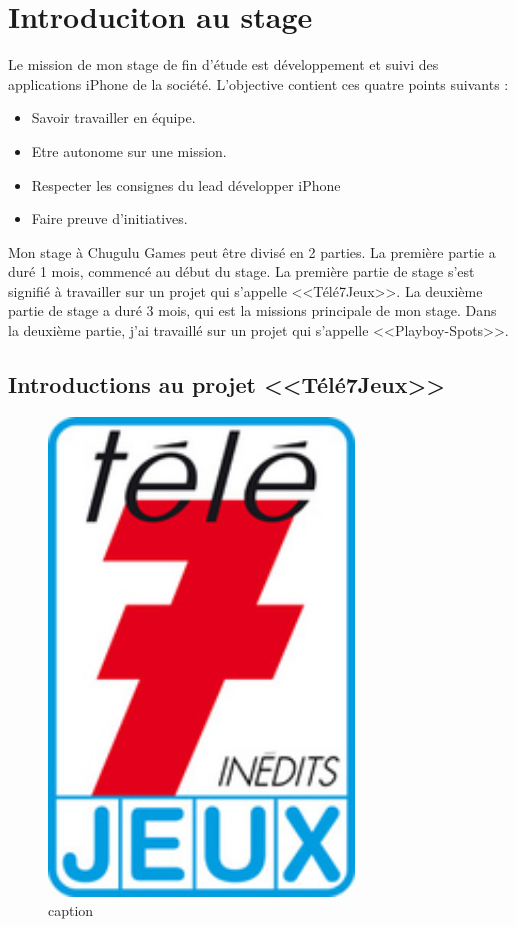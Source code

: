 \section{Introduciton au stage} %
Le mission de mon stage de fin d'étude est développement et suivi des applications iPhone de la société. L'objective contient ces quatre points suivants : 

\begin{itemize}
	\item Savoir travailler en équipe.
	\item Etre autonome sur une mission.
	\item Respecter les consignes du lead développer iPhone
	\item Faire preuve d'initiatives.
\end{itemize}

Mon stage à Chugulu Games peut être divisé en 2 parties. La première partie a duré 1 mois, commencé au début du stage. La première partie de stage s'est signifié à travailler sur un projet qui s'appelle <<Télé7Jeux>>. La deuxième partie de stage a duré 3 mois, qui est la missions principale de mon stage. Dans la deuxième partie, j'ai travaillé sur un projet qui s'appelle <<Playboy-Spots>>.

\subsection{Introductions au projet <<Télé7Jeux>>} %
\label{ssub:introductions_au_projet_télé7jeux}


\begin{figure}[htbp]
	\centering
		\includegraphics[height=5in]{Image/tele_7_jeux_logo_lien_logo.jpg}
	\caption{caption}
	\label{fig:Image_tele_7_jeux_logo_lien_logo}
\end{figure}



